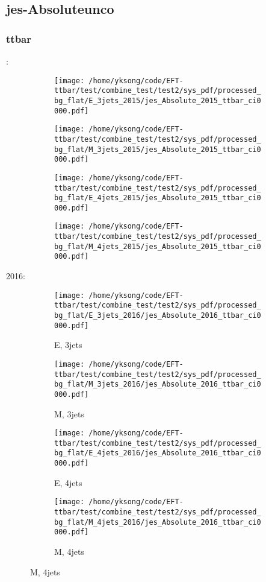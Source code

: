 \documentclass{beamer}
\begin{document}
\subsection{jes-Absoluteunco}

\begin{frame}
\frametitle{ttbar}
\fontsize{5}{1}:
\begin{figure}
\centering
\begin{subfigure}[b]{0.24\textwidth}
\texttt{[image: /home/yksong/code/EFT-ttbar/test/combine\_test/test2/sys\_pdf/processed\_bg\_flat/E\_3jets\_2015/jes\_Absolute\_2015\_ttbar\_ci0000.pdf]}
\end{subfigure}
\begin{subfigure}[b]{0.24\textwidth}
\texttt{[image: /home/yksong/code/EFT-ttbar/test/combine\_test/test2/sys\_pdf/processed\_bg\_flat/M\_3jets\_2015/jes\_Absolute\_2015\_ttbar\_ci0000.pdf]}
\end{subfigure}
\begin{subfigure}[b]{0.24\textwidth}
\texttt{[image: /home/yksong/code/EFT-ttbar/test/combine\_test/test2/sys\_pdf/processed\_bg\_flat/E\_4jets\_2015/jes\_Absolute\_2015\_ttbar\_ci0000.pdf]}
\end{subfigure}
\begin{subfigure}[b]{0.24\textwidth}
\texttt{[image: /home/yksong/code/EFT-ttbar/test/combine\_test/test2/sys\_pdf/processed\_bg\_flat/M\_4jets\_2015/jes\_Absolute\_2015\_ttbar\_ci0000.pdf]}
\end{subfigure}
\end{figure}
2016:
\begin{figure}
\centering
\begin{subfigure}[b]{0.24\textwidth}
\texttt{[image: /home/yksong/code/EFT-ttbar/test/combine\_test/test2/sys\_pdf/processed\_bg\_flat/E\_3jets\_2016/jes\_Absolute\_2016\_ttbar\_ci0000.pdf]}
\captionsetup{font=tiny}
\caption{E, 3jets}
\end{subfigure}
\begin{subfigure}[b]{0.24\textwidth}
\texttt{[image: /home/yksong/code/EFT-ttbar/test/combine\_test/test2/sys\_pdf/processed\_bg\_flat/M\_3jets\_2016/jes\_Absolute\_2016\_ttbar\_ci0000.pdf]}
\captionsetup{font=tiny}
\caption{M, 3jets}
\end{subfigure}
\begin{subfigure}[b]{0.24\textwidth}
\texttt{[image: /home/yksong/code/EFT-ttbar/test/combine\_test/test2/sys\_pdf/processed\_bg\_flat/E\_4jets\_2016/jes\_Absolute\_2016\_ttbar\_ci0000.pdf]}
\captionsetup{font=tiny}
\caption{E, 4jets}
\end{subfigure}
\begin{subfigure}[b]{0.24\textwidth}
\texttt{[image: /home/yksong/code/EFT-ttbar/test/combine\_test/test2/sys\_pdf/processed\_bg\_flat/M\_4jets\_2016/jes\_Absolute\_2016\_ttbar\_ci0000.pdf]}
\captionsetup{font=tiny}
\caption{M, 4jets}
\end{subfigure}
\end{figure}
\end{frame}
\end{document}
